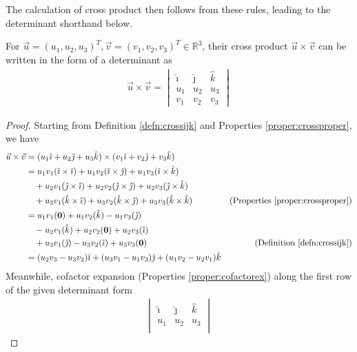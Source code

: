 The calculation of cross product then follows from these rules, leading to the determinant shorthand below. 
\begin{proper}
\label{proper:crossdet}
For $\vec{u} = (u_1, u_2, u_3)^T, \vec{v} = (v_1, v_2, v_3)^T \in \mathbb{R}^3$, their cross product $\vec{u} \times \vec{v}$ can be written in the form of a determinant as
\begin{align}
\vec{u} \times \vec{v} =
\begin{vmatrix}
\hat{\imath} & \hat{\jmath} & \hat{k} \\
u_1 & u_2 & u_3 \\
v_1 & v_2 & v_3
\end{vmatrix}
\label{eqn:crossdet}
\end{align}
\end{proper}
\begin{proof}
Starting from Definition \ref{defn:crossijk} and Properties \ref{proper:crossproper}, we have
\begin{align*}
\vec{u} \times \vec{v} &= (u_1\hat{\imath} + u_2\hat{\jmath} + u_3\hat{k}) \times (v_1\hat{\imath} + v_2\hat{\jmath} + v_3\hat{k}) \\
&= u_1v_1(\hat{\imath}\times\hat{\imath}) + u_1v_2(\hat{\imath}\times\hat{\jmath}) + u_1v_3(\hat{\imath}\times\hat{k}) \\
&\quad +u_2v_1(\hat{\jmath}\times\hat{\imath}) + u_2v_2(\hat{\jmath}\times\hat{\jmath}) + u_2v_3(\hat{\jmath}\times\hat{k}) \\
&\quad +u_3v_1(\hat{k}\times\hat{\imath}) + u_3v_2(\hat{k}\times\hat{\jmath}) + u_3v_3(\hat{k}\times\hat{k}) & \text{(Properties \ref{proper:crossproper})}\\
&= u_1v_1(\textbf{0}) + u_1v_2(\hat{k}) - u_1v_3(\hat{\jmath}) \\
&\quad -u_2v_1(\hat{k}) + u_2v_2(\textbf{0}) + u_2v_3(\hat{\imath}) \\
&\quad +u_3v_1(\hat{\jmath}) - u_3v_2(\hat{\imath}) + u_3v_3(\textbf{0}) & \text{(Definition \ref{defn:crossijk})}\\
&= (u_2v_3 - u_3v_2)\hat{\imath} + (u_3v_1 - u_1v_3)\hat{\jmath} + (u_1v_2 - u_2v_1)\hat{k} 
\end{align*}
Meanwhile, cofactor expansion (Properties \ref{proper:cofactorex}) along the first row of the given determinant form
\begin{align*}
\begin{vmatrix}
\hat{\imath} & \hat{\jmath} & \hat{k} \\
u_1 & u_2 & u_3 \\

\end{vmatrix}
\end{align*}
\end{proof}
